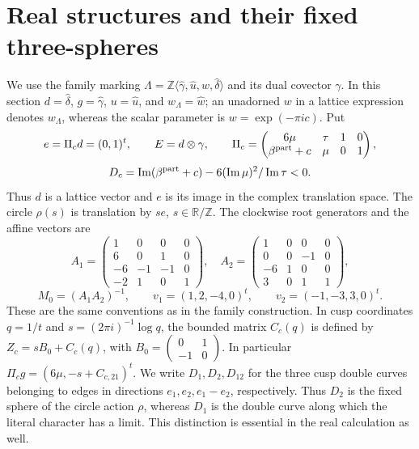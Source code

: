 \section{Real structures and their fixed three-spheres}\label{mapsI:real-forms}

We use the family marking
$\Lambda=\mathbb Z\langle\widehat\gamma,\widehat u,\widehat w,
\widehat\delta\rangle$ and its dual covector $\gamma$.
In this section $d=\widehat\delta$, $g=\widehat\gamma$,
$u=\widehat u$, and $w_{\Lambda}=\widehat w$; an unadorned $w$ in a
lattice expression denotes $w_{\Lambda}$, whereas the scalar parameter is
$w=\exp(-\pi i c)$. Put
\[
 e=\Pi_c d=(0,1)^t,\qquad E=d\otimes\gamma,
 \qquad \Pi_c=
 \begin{pmatrix}6\mu&\tau&1&0\\\beta^{\rm part}+c&\mu&0&1\end{pmatrix},
\]
\[
 D_c=\operatorname{Im}(\beta^{\rm part}+c)
       -6(\operatorname{Im}\mu)^2/\operatorname{Im}\tau<0.
\]
Thus $d$ is a lattice vector and $e$ is its image in the complex translation
space. The circle $\rho(s)$ is translation by $se$, $s\in\mathbb R/\mathbb Z$.
The clockwise root generators and the affine vectors are
\[
 A_1=\begin{pmatrix}1&0&0&0\\6&0&1&0\\-6&-1&-1&0\\-2&1&0&1\end{pmatrix},\quad
 A_2=\begin{pmatrix}1&0&0&0\\0&0&-1&0\\-6&1&0&0\\3&0&1&1\end{pmatrix},
\]
\[
 M_0=(A_1A_2)^{-1},\qquad
 v_1=(1,2,-4,0)^t,\qquad v_2=(-1,-3,3,0)^t.
\]
These are the same conventions as in the family construction. In cusp
coordinates $q=1/t$ and $s=(2\pi i)^{-1}\log q$, the bounded matrix $C_c(q)$
is defined by $Z_c=sB_0+C_c(q)$, with
$B_0=\left(\begin{smallmatrix}0&1\\-1&0\end{smallmatrix}\right)$.
In particular $\Pi_cg=(6\mu,-s+C_{c,21})^t$.
We write $D_1,D_2,D_{12}$ for the three cusp double curves belonging to
edges in directions $e_1,e_2,e_1-e_2$, respectively. Thus $D_2$ is the
fixed sphere of the circle action $\rho$, whereas $D_1$ is the double
curve along which the literal character has a limit. This distinction
is essential in the real calculation as well.

